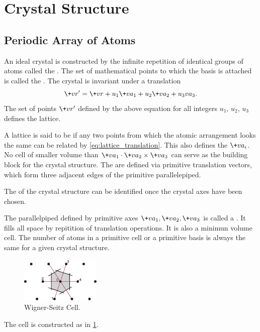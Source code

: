 \documentclass[hidelinks]{article}
\begin{document}
\section{Crystal Structure} %
\label{sec:crystal_structure}

\subsection{Periodic Array of Atoms} %
\label{sub:periodic_array_of_atoms}

An ideal crystal is constructed by the infinite repetition of identical groups of atoms called the . The set of mathematical points to which the basis is attached is called the . The crystal is invariant under a translation
\begin{equation}
    \label{eq:lattice_translation}
    \+vr' = \+vr + u_1 \+va_1 + u_2 \+va_2 + u_3 va_3. 
\end{equation}
The set of points $\+vr'$ defined by the above equation for all integers $u_1$, $u_2$, $u_3$ defines the lattice.
\par
A lattice is said to be  if any two points from which the atomic arrangement looks the same can be related by \eqref{eq:lattice_translation}. This also defines the  $\+va_i$. No cell of smaller volume than $\+va_1 \cdot \+va_2 \times \+va_3$ can serve as the building block for the crystal structure. The  are defined via primitive translation vectors, which form three adjacent edges of the primitive parallelepiped.
\par
The  of the crystal structure can be identified once the crystal axes have been chosen.
\par
The parallelpiped defined by primitive axes $\+va_1,\+va_2,\+va_3$ is called a . It fills all space by repitition of translation operations. It is also a minimun volume cell. The number of atoms in a primitive cell or a primitive basis is always the same for a given crystal structure.
\begin{figure}[h]
    \centering
    \includegraphics[width=1.5in]{src/WignerSeitz.jpg}
    \caption{Wigner\mbox{-}Seitz Cell.}%
    \label{fig:wigner_seitz}
\end{figure}
\par
The  cell is constructed as in \cref{fig:wigner_seitz}.
\end{document}
